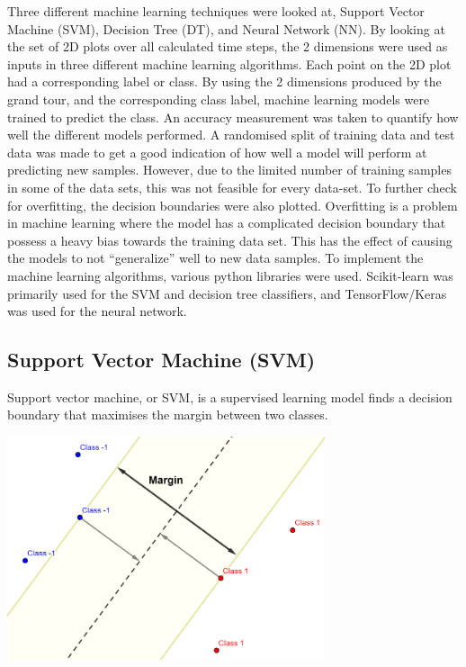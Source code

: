 \documentclass[a4paper,11pt,twoside]{article}
\begin{document}
Three different machine learning techniques were looked at, Support Vector Machine (SVM), Decision Tree (DT), and Neural Network (NN). By looking at the set of 2D plots over all calculated time steps, the 2 dimensions were used as inputs in three different machine learning algorithms. Each point on the 2D plot had a corresponding label or class. By using the 2 dimensions produced by the grand tour, and the corresponding class label, machine learning models were trained to predict the class. An accuracy measurement was taken to quantify how well the different models performed. A randomised split of training data and test data was made to get a good indication of how well a model will perform at predicting new samples. However, due to the limited number of training samples in some of the data sets, this was not feasible for every data-set. To further check for overfitting, the decision boundaries were also plotted.
\newline
\newline
Overfitting is a problem in machine learning where the model has a complicated decision boundary that possess a heavy bias towards the training data set. This has the effect of causing the models to not “generalize” well to new data samples.
\newline
\newline
To implement the machine learning algorithms, various python libraries were used. Scikit-learn was primarily used for the SVM and decision tree classifiers, and TensorFlow/Keras was used for the neural network.

\newpage
\subsection{Support Vector Machine (SVM)}

Support vector machine, or SVM, is a supervised learning model finds a decision boundary that maximises the margin between two classes. 

\begin{center}
\includegraphics[width=0.7\textwidth]{SVM.png}

\end{center}
\end{document}
